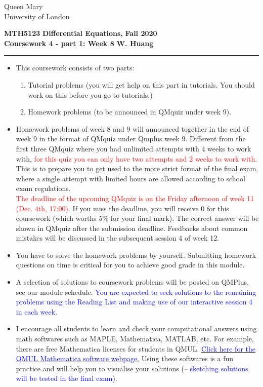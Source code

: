 \documentclass[11pt,a4paper,twoside]{article}
\begin{document}
	\begin{singlespace}
		\begin{center}
			\Huge Queen Mary\\
			\LARGE University of London
		\end{center}
		\Large \textbf{MTH5123} \hfill \Large \textbf{Differential Equations,} \hfill \Large \textbf{Fall 2020}\\
		\large \textbf{Coursework 4 - part 1: Week 8} \hfill \large \textbf{W. Huang}
		\rule{\textwidth}{0.4pt}
	\end{singlespace}
	\begin{itemize}
		\item This coursework consists of two parts:
		\begin{enumerate}[\bfseries I.]
			\item Tutorial problems (you will get help on this part in tutorials. You should work on this before you go to tutorials.)
			\item Homework problems (to be announced in QMquiz under week 9).
		\end{enumerate}
		\item Homework problems of week 8 and 9 will announced together in the end of week 9 in the format of QMquiz under Qmplus week 9. Different from the first three QMquiz where you had unlimited attempts with 4 weeks to work with, \textcolor{red}{for this quiz you can only have two attempts and 2 weeks to work with}. This is to prepare you to get used to the more strict format of the final exam, where a single attempt with limited hours are allowed according to school exam regulations.\\
		\textcolor{red}{The deadline of the upcoming QMquiz is on the Friday afternoon of week 11 (Dec. 4th, 17:00)}. If you miss the deadline, you will receive 0 for this coursework (which worths 5\% for your final mark). The correct answer will be shown in QMquiz after the submission deadline. Feedbacks about common mistakes will be discussed in the subsequent session 4 of week 12.
		\item You have to solve the homework problems by yourself. Submitting homework questions on time is critical for you to achieve good grade in this module.
		\item A selection of solutions to coursework problems will be posted on QMPlus, see our module schedule. \textcolor{blue}{You are expected to seek solutions to the remaining problems using the Reading List and making use of our interactive session 4 in each week}.
		\item I encourage all students to learn and check your computational answers using math softwares such as MAPLE, Mathematica, MATLAB, etc. For example, there are free Mathematica licenses for students in QMUL. \href{https://www.its.qmul.ac.uk/services/service-catalogue/items/software---computational-mathematica.html}{\textcolor{blue}{Click here for the QMUL Mathematica software webpage.}} Using these softwares is a fun practice and will help you to visualise your solutions (– \textcolor{blue}{sketching solutions will be tested in the final exam}).
	\end{itemize}
\end{document}
